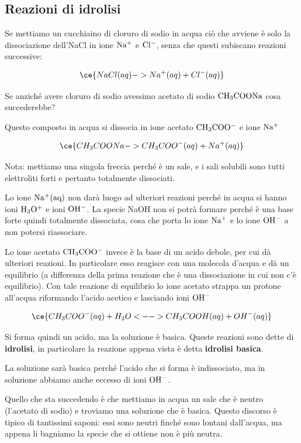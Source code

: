\subsection{Reazioni di idrolisi}
Se mettiamo un cucchiaino di cloruro di sodio in acqua ciò che avviene è solo la dissociazione dell'NaCl in ione $\rm Na^+$ e $\rm Cl^-$, senza che questi subiscano reazioni successive:

$$\ce{NaCl(aq) -> Na^+(aq) + Cl^-(aq)}$$

Se anziché avere cloruro di sodio avessimo acetato di sodio $\rm CH_3COONa$ cosa succederebbe?

Questo composto in acqua si dissocia in ione acetato $\rm CH_3COO^-$ e ione $\rm Na^+$

$$\ce{CH_3COONa -> CH_3COO^-(aq) + Na^+(aq)}$$

Nota: mettiamo una singola freccia perché è un sale, e i sali solubili sono tutti elettroliti forti e pertanto totalmente dissociati.

Lo ione $\rm Na^+(aq)$ non darà luogo ad ulteriori reazioni perché in acqua si hanno ioni $\rm H_3O^+$ e ioni $\rm OH^-$. La specie NaOH non si potrà formare perché è una base forte quindi totalmente dissociata, cosa che porta lo ione $\rm Na^+$ e lo ione $\rm OH^-$ a non potersi riassociare.

Lo ione acetato $\rm CH_3COO^-$ invece è la base di un acido debole, per cui dà ulteriori reazioni. In particolare esso reagisce con una molecola d'acqua e dà un equilibrio (a differenza della prima reazione che è una dissociazione in cui non c'è equilibrio). Con tale reazione di equilibrio lo ione acetato strappa un protone all'acqua riformando l'acido acetico e lasciando ioni $\rm OH^-$

$$\ce{CH_3COO^-(aq) + H_2O <--> CH_3COOH(aq) + OH^-(aq)}$$

Si forma quindi un acido, ma la soluzione è basica. Queste reazioni sono dette di \textbf{idrolisi}, in particolare la reazione appena vista è detta \textbf{idrolisi basica}.

La soluzione sarà basica perché l'acido che si forma è indissociato, ma in soluzione abbiamo anche eccesso di ioni $\rm OH^-$.

Quello che sta succedendo è che mettiamo in acqua un sale che è neutro (l'acetato di sodio) e troviamo una soluzione che è basica. Questo discorso è tipico di tantissimi saponi: essi sono neutri finché sono lontani dall'acqua, ma appena li bagniamo la specie che si ottiene non è più neutra.

